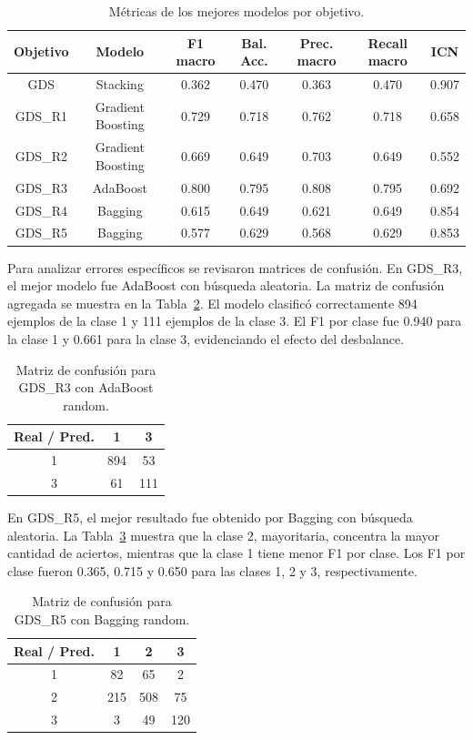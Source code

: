 \documentclass[conference]{IEEEtran}
\begin{document}
\begin{table}[!t]
\centering
\begin{tabular}{|c|c|c|c|c|c|c|}
\hline
\textbf{Objetivo} & \textbf{Modelo} & \textbf{F1 macro} & \textbf{Bal. Acc.} & \textbf{Prec. macro} & \textbf{Recall macro} & \textbf{ICN} \\
\hline
GDS & Stacking & 0.362 & 0.470 & 0.363 & 0.470 & 0.907 \\
GDS\_R1 & Gradient Boosting & 0.729 & 0.718 & 0.762 & 0.718 & 0.658 \\
GDS\_R2 & Gradient Boosting & 0.669 & 0.649 & 0.703 & 0.649 & 0.552 \\
GDS\_R3 & AdaBoost & 0.800 & 0.795 & 0.808 & 0.795 & 0.692 \\
GDS\_R4 & Bagging & 0.615 & 0.649 & 0.621 & 0.649 & 0.854 \\
GDS\_R5 & Bagging & 0.577 & 0.629 & 0.568 & 0.629 & 0.853 \\
\hline
\end{tabular}
\caption{Métricas de los mejores modelos por objetivo.}
\label{tab:metricas}
\end{table}

Para analizar errores específicos se revisaron matrices de confusión. En GDS\_R3, el mejor modelo fue AdaBoost con búsqueda aleatoria. La matriz de confusión agregada se muestra en la Tabla~\ref{tab:cmr3}. El modelo clasificó correctamente 894 ejemplos de la clase 1 y 111 ejemplos de la clase 3. El F1 por clase fue 0.940 para la clase 1 y 0.661 para la clase 3, evidenciando el efecto del desbalance.

\begin{table}[!h]
\centering
\begin{tabular}{|c|c|c|}
\hline
\textbf{Real / Pred.} & \textbf{1} & \textbf{3} \\
\hline
1 & 894 & 53 \\
3 & 61 & 111 \\
\hline
\end{tabular}
\caption{Matriz de confusión para GDS\_R3 con AdaBoost random.}
\label{tab:cmr3}
\end{table}

En GDS\_R5, el mejor resultado fue obtenido por Bagging con búsqueda aleatoria. La Tabla~\ref{tab:cmr5} muestra que la clase 2, mayoritaria, concentra la mayor cantidad de aciertos, mientras que la clase 1 tiene menor F1 por clase. Los F1 por clase fueron 0.365, 0.715 y 0.650 para las clases 1, 2 y 3, respectivamente.

\begin{table}[!h]
\centering
\begin{tabular}{|c|c|c|c|}
\hline
\textbf{Real / Pred.} & \textbf{1} & \textbf{2} & \textbf{3} \\
\hline
1 & 82 & 65 & 2 \\
2 & 215 & 508 & 75 \\
3 & 3 & 49 & 120 \\
\hline
\end{tabular}
\caption{Matriz de confusión para GDS\_R5 con Bagging random.}
\label{tab:cmr5}
\end{table}
\end{document}
